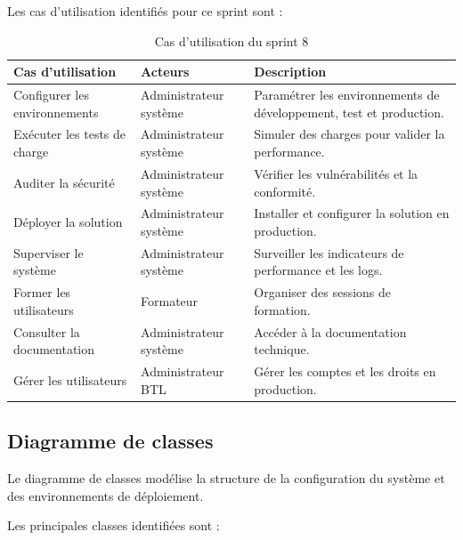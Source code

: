Les cas d'utilisation identifiés pour ce sprint sont :

\begin{table}[H]
\centering
\begin{tabular}{|p{4cm}|p{3.5cm}|p{6cm}|}
\hline
\textbf{Cas d'utilisation} & \textbf{Acteurs} & \textbf{Description} \\
\hline
Configurer les environnements & Administrateur système & Paramétrer les environnements de développement, test et production. \\
\hline
Exécuter les tests de charge & Administrateur système & Simuler des charges pour valider la performance. \\
\hline
Auditer la sécurité & Administrateur système & Vérifier les vulnérabilités et la conformité. \\
\hline
Déployer la solution & Administrateur système & Installer et configurer la solution en production. \\
\hline
Superviser le système & Administrateur système & Surveiller les indicateurs de performance et les logs. \\
\hline
Former les utilisateurs & Formateur & Organiser des sessions de formation. \\
\hline
Consulter la documentation & Administrateur système & Accéder à la documentation technique. \\
\hline
Gérer les utilisateurs & Administrateur BTL & Gérer les comptes et les droits en production. \\
\hline
\end{tabular}
\caption{Cas d'utilisation du sprint 8}
\label{tab:use-cases-deploiement}
\end{table}

\subsection{Diagramme de classes}
\label{subsec:sprint8-classes}

Le diagramme de classes modélise la structure de la configuration du système et des environnements de déploiement.

Les principales classes identifiées sont :

